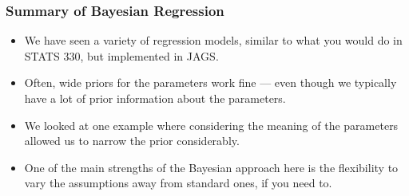\documentclass{beamer}
\begin{document}
\begin{frame}[fragile]
\frametitle{Summary of Bayesian Regression}

\begin{itemize}
\item We have seen a variety of regression models, similar to what you would
do in STATS 330, but implemented in JAGS.\pause
\item Often, wide priors for the parameters work fine --- even though we typically
have a lot of prior information about the parameters.\pause
\item We looked at one example where considering the meaning of the parameters
allowed us to narrow the prior considerably.\pause
\item One of the main strengths of the Bayesian approach here is the flexibility
to vary the assumptions away from standard ones, if you need to.
\end{itemize}

\end{frame}
\end{document}
